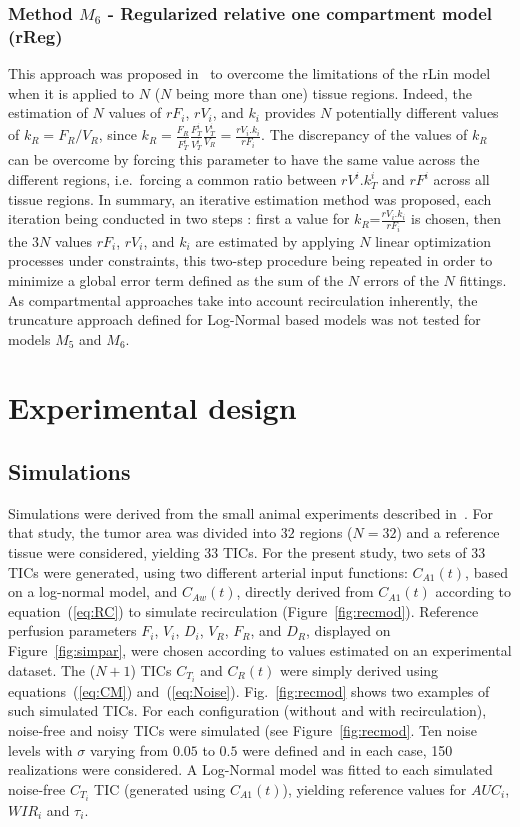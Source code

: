 \subsubsection{Method $M_6$ - Regularized relative one compartment model (rReg)}
This approach was proposed in~\cite{Doury:2016fi} to overcome the limitations of the rLin model when it is applied to $N$ ($N$ being more than one) tissue regions. Indeed, the estimation of $N$ values of $rF_i$, $rV_i$, and $k_i$ provides $N$ potentially different values of $k_R = F_R/V_R$, since $k_R = \frac{F_R}{F_T^i}\frac{F_T^i}{V_T^i}\frac{V_T^i}{V_R} = \frac{rV_i.k_i}{rF_i}$.
The discrepancy of the values of $k_R$ can be overcome by forcing this parameter to have the same value across the different regions, i.e.~forcing a common ratio between $rV^i.k^i_T$ and $rF^i$ across all tissue regions. In summary, an iterative estimation method was proposed, each iteration being conducted in two steps : first a value for $k_R$=$\frac{rV_i.k_i}{rF_i}$ is chosen, then the $3N$ values $rF_i$, $rV_i$, and $k_i$ are estimated by applying $N$ linear optimization processes under constraints, this two-step procedure being repeated in order to minimize a global error term defined as the sum of the $N$ errors of the $N$ fittings.
As compartmental approaches take into account recirculation inherently, the  truncature approach defined for Log-Normal based models was not tested for models $M_5$ and $M_6$. 

\section{Experimental design}

\subsection{Simulations}
Simulations were derived from the small animal experiments described in~\cite{Doury:2017fz}. For that study, the tumor area was divided into $32$ regions ($N=32$) and a reference tissue were considered, yielding $33$ TICs. For the present study, two sets of 33 TICs were generated, using two different arterial input functions: $C_{A1}(t)$, based on a log-normal model, and $C_{Aw}(t)$, directly derived from $C_{A1}(t)$ according to equation~(\ref{eq:RC}) to simulate recirculation (Figure~\ref{fig:recmod}).
Reference perfusion parameters $F_i$, $V_i$, $D_i$, $V_R$, $F_R$, and $D_R$, displayed on Figure~\ref{fig:simpar}, were chosen according to values estimated on an experimental dataset. The ($N+1$) TICs $C_{T_i}$ and $C_R(t)$ were simply derived using equations~(\ref{eq:CM}) and~(\ref{eq:Noise}). Fig.~\ref{fig:recmod} shows two examples of such simulated TICs.
For each configuration (without and with recirculation), noise-free and noisy TICs were simulated (see Figure~\ref{fig:recmod}. Ten noise levels with $\sigma$ varying from $0.05$ to $0.5$ were defined and in each case, 150 realizations were considered.
A Log-Normal model was fitted to each simulated noise-free $C_{T_i}$ TIC (generated using $C_{A1}(t)$), yielding reference values for $AUC_i$, $WIR_i$ and $\tau_i$. 

